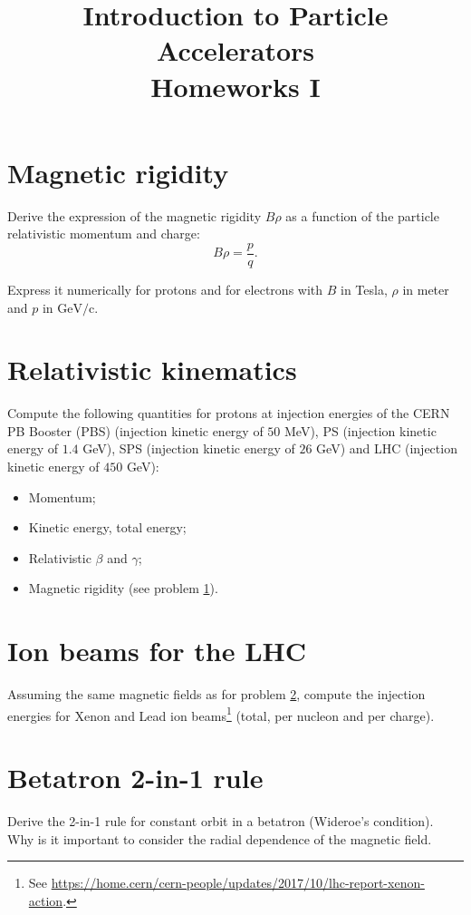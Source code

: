 \documentclass[12pt]{article}
\begin{document}
\title{Introduction to Particle Accelerators\\
\large Homeworks I}
\author{}
\date{}
 
\maketitle
 
\section{Magnetic rigidity}
\label{problem1}
Derive the expression of the magnetic rigidity $B\rho$ as a function of the particle relativistic momentum and charge:
\begin{equation}
B \rho = \frac{p}{q}.
\end{equation}

Express it numerically for protons and for electrons with $B$ in Tesla, $\rho$ in meter and $p$ in $\text{GeV/c}$.

\section{Relativistic kinematics}
\label{problem2}
Compute the following quantities for protons at injection energies of the CERN PB Booster (PBS) (injection kinetic energy of $50$ MeV), PS (injection kinetic energy of $1.4$ GeV), SPS (injection kinetic energy of $26$ GeV) and LHC (injection kinetic energy of $450$ GeV):
\begin{itemize}
\item Momentum;
\item Kinetic energy, total energy;
\item Relativistic $\beta$ and $\gamma$;
\item Magnetic rigidity (see problem \ref{problem1}).
\end{itemize}

\section{Ion beams for the LHC}
Assuming the same magnetic fields as for problem \ref{problem2}, compute the injection energies for Xenon and Lead ion beams\footnote{See \url{https://home.cern/cern-people/updates/2017/10/lhc-report-xenon-action}.} (total, per nucleon and per charge).

\section{Betatron 2-in-1 rule}
Derive the 2-in-1 rule for constant orbit in a betatron (Wideroe's condition). Why is it important to consider the radial dependence of the magnetic field.
 
\end{document}
